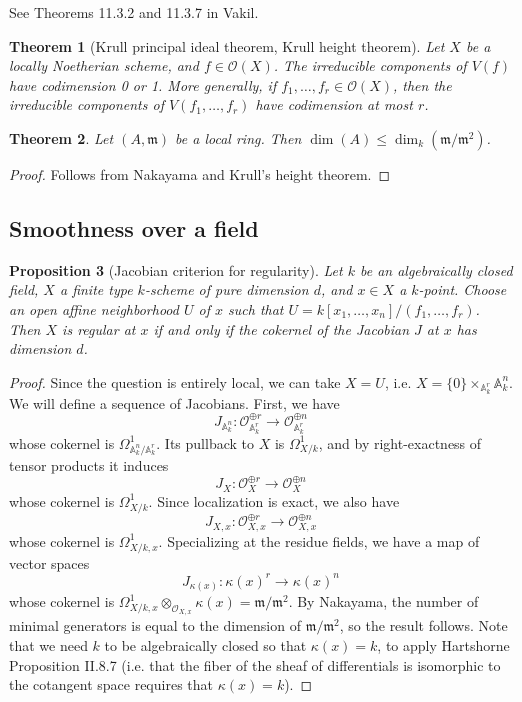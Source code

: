 \documentclass[10pt]{article}
\newtheorem{thm}{Theorem}[section]
\newtheorem{prop}[thm]{Proposition}
\theoremstyle{definition}
\newcommand{\mf}{\mathfrak}
\newcommand{\OO}{\mathcal{O}}
\begin{document}
See Theorems 11.3.2 and 11.3.7 in Vakil.
\begin{thm}[Krull principal ideal theorem, Krull height theorem]
Let $X$ be a locally Noetherian scheme, and $f \in \OO(X)$.  The irreducible components of $V(f)$ have codimension 0 or 1.  More generally, if $f_1, \ldots, f_r \in \OO(X)$, then the irreducible components of $V(f_1, \ldots, f_r)$ have codimension at most $r$.
\end{thm}

\begin{thm}
Let $(A, \mf{m})$ be a local ring.  Then $\dim(A) \leq \dim_k(\mf{m}/\mf{m}^2)$.
\end{thm}
\begin{proof}
Follows from Nakayama and Krull's height theorem.
\end{proof}



\subsection{Smoothness over a field}


\begin{prop}[Jacobian criterion for regularity]
Let $k$ be an algebraically closed field, $X$ a finite type $k$-scheme of pure dimension $d$, and $x \in X$ a $k$-point.  Choose an open affine neighborhood $U$ of $x$ such that $U = k[x_1, \ldots, x_n]/(f_1, \ldots, f_r)$.  Then $X$ is regular at $x$ if and only if the cokernel of the Jacobian $J$ at $x$ has dimension $d$.
\end{prop}
\begin{proof}
Since the question is entirely local, we can take $X = U$, i.e. $X = \{0\} \times_{\mathbb{A}^r_{k}} \mathbb{A}^n_{k}$.  We will define a sequence of Jacobians.  First, we have
$$J_{\mathbb{A}^n_k}: \OO_{\mathbb{A}^r_k}^{\oplus r} \rightarrow  \OO_{\mathbb{A}^r_k}^{\oplus n} $$
whose cokernel is $\Omega^1_{\mathbb{A}^n_k/\mathbb{A}^r_k}$.  Its pullback to $X$ is $\Omega^1_{X/k}$, and by right-exactness of tensor products it induces
$$J_X: \OO_{X}^{\oplus r} \rightarrow \OO_{X}^{\oplus n}$$
whose cokernel is $\Omega^1_{X/k}$.  Since localization is exact, we also have
$$J_{X, x}: \OO_{X,x}^{\oplus r} \rightarrow \OO_{X,x}^{\oplus n}$$
whose cokernel is $\Omega^1_{X/k, x}$.
Specializing at the residue fields, we have a map of vector spaces
$$J_{\kappa(x)}: \kappa(x)^r \rightarrow \kappa(x)^n$$
whose cokernel is $\Omega^1_{X/k, x} \otimes_{\OO_{X, x}} \kappa(x) = \mf{m}/\mf{m}^2$.  By Nakayama, the number of minimal generators is equal to the dimension of $\mf{m}/\mf{m}^2$, so the result follows.  Note that we need $k$ to be algebraically closed so that $\kappa(x) = k$, to apply Hartshorne Proposition II.8.7 (i.e. that the fiber of the sheaf of differentials is isomorphic to the cotangent space requires that $\kappa(x) = k$).
\end{proof}
\end{document}
